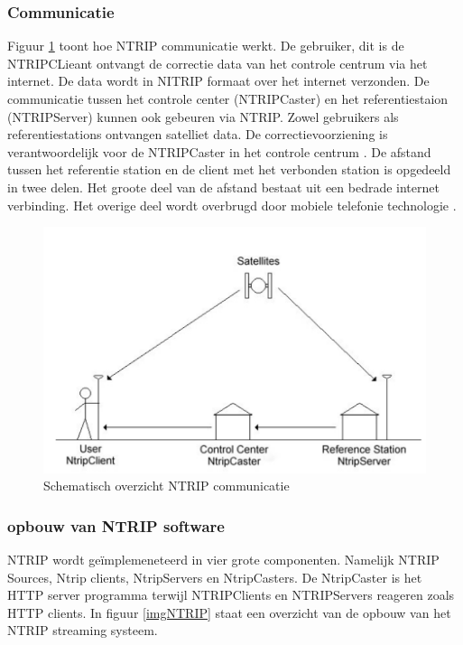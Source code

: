 \subsubsection{Communicatie}
Figuur \ref{imgNTRIPCom} toont hoe NTRIP communicatie werkt. De gebruiker, dit is de NTRIPCLieant ontvangt de correctie data van het controle centrum via het internet. De data wordt in NITRIP formaat over het internet verzonden. De communicatie tussen het controle center (NTRIPCaster) en het referentiestaion (NTRIPServer) kunnen ook gebeuren via NTRIP. Zowel gebruikers als referentiestations ontvangen satelliet data. De correctievoorziening is verantwoordelijk voor de NTRIPCaster in het controle centrum \cite{LBibNTRIP4}. De afstand tussen het referentie station en de client met het verbonden station is opgedeeld in twee delen. Het groote deel van de afstand bestaat uit een bedrade internet verbinding. Het overige deel wordt overbrugd door mobiele telefonie technologie \cite{LBibNTRIP2}.

\begin{figure}[hpb]
	\includegraphics[scale=0.65]{NTRIPCommunication.png}
	\caption{Schematisch overzicht NTRIP communicatie \cite{LBibNTRIP4}}
	\label{imgNTRIPCom}
\end{figure}

\subsubsection{opbouw van NTRIP software}
\label{LONS}
NTRIP wordt ge\"implemeneteerd in vier grote componenten. Namelijk NTRIP Sources, Ntrip clients, NtripServers en NtripCasters. De NtripCaster is het HTTP server programma terwijl NTRIPClients en NTRIPServers reageren zoals HTTP clients\cite{LBibNTRIP}.  In figuur \ref{imgNTRIP} staat een overzicht van de opbouw van het NTRIP streaming systeem.

